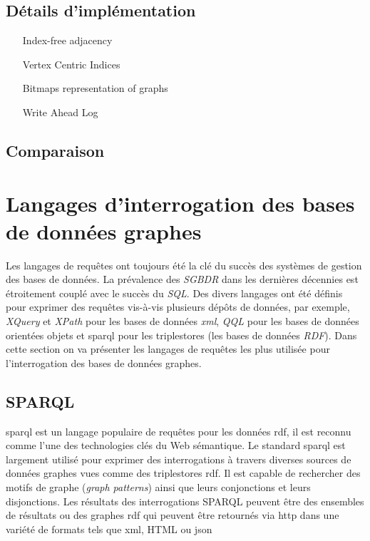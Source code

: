   \subsection{Détails d'implémentation}
  \label{graph-internals}
  \begin{itemize}
  \item [Index-free adjacency]
  \item [Vertex Centric Indices]
  \item [Bitmaps representation of graphs]
  \item [Write Ahead Log]
  \end{itemize}

  \subsection{Comparaison}
  \label{graphdb-comp}

\newpage
\section{Langages d'interrogation des bases de données graphes}
\label{query-languages}

Les langages de requêtes ont toujours été la clé du succès des
systèmes de gestion des bases de données. La prévalence des
\emph{\acrshort{SGBDR}} dans les dernières décennies est étroitement
couplé avec le succès du \emph{SQL}. Des divers langages ont été
définis pour exprimer des requêtes vis-à-vis plusieurs dépôts de
données, par exemple, \emph{XQuery} \cite{boag2002xquery} et
\emph{XPath} \cite{clark1999xml} pour les bases de données
\emph{\acrshort{xml}}, \emph{QQL} \cite{alashqur1989oql} pour les
bases de données orientées objets et \acrshort{sparql}
\cite{prud2008sparql} pour les triplestores (les bases de données
\emph{RDF}). Dans cette section on va présenter les langages de
requêtes les plus utilisée pour l'interrogation des bases de données
graphes.

  \subsection{SPARQL}
  \label{sec:sparql}

  \acrshort{sparql} \cite{prud2008sparql} est un langage populaire de
  requêtes pour les données \acrshort{rdf}, il est reconnu comme l'une
  des technologies clés du Web sémantique. Le standard
  \acrshort{sparql} est largement utilisé pour exprimer des
  interrogations à travers diverses sources de données graphes vues
  comme des triplestores \acrshort{rdf}. Il est capable de rechercher
  des motifs de graphe (\emph{graph patterns}) ainsi que leurs
  conjonctions et leurs disjonctions. Les résultats des interrogations
  \textsc{SPARQL} peuvent être des ensembles de résultats ou des
  graphes \acrshort{rdf} qui peuvent être retournés via
  \acrshort{http} dans une variété de formats tels que \acrshort{xml},
  HTML ou \acrshort{json}


